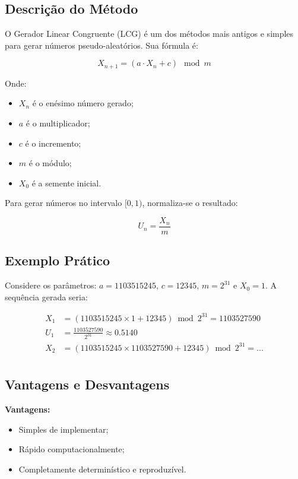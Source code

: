 \documentclass[12pt,a4paper]{article}
\begin{document}
\subsection{Descrição do Método}

O Gerador Linear Congruente (LCG) é um dos métodos mais antigos e simples para gerar números pseudo-aleatórios. Sua fórmula é:

\begin{equation}
X_{n+1} = (a \cdot X_n + c) \mod m
\end{equation}

Onde:
\begin{itemize}
    \item $X_n$ é o enésimo número gerado;
    \item $a$ é o multiplicador;
    \item $c$ é o incremento;
    \item $m$ é o módulo;
    \item $X_0$ é a semente inicial.
\end{itemize}

Para gerar números no intervalo $[0, 1)$, normaliza-se o resultado:

\begin{equation}
U_n = \frac{X_n}{m}
\end{equation}

\subsection{Exemplo Prático}

Considere os parâmetros: $a = 1103515245$, $c = 12345$, $m = 2^{31}$ e $X_0 = 1$. A sequência gerada seria:

\begin{align*}
X_1 &= (1103515245 \times 1 + 12345) \bmod 2^{31} = 1103527590 \\
U_1 &= \frac{1103527590}{2^{31}} \approx 0.5140 \\
X_2 &= (1103515245 \times 1103527590 + 12345) \bmod 2^{31} = ... \\
\end{align*}

\subsection{Vantagens e Desvantagens}

\textbf{Vantagens:}
\begin{itemize}
    \item Simples de implementar;
    \item Rápido computacionalmente;
    \item Completamente determinístico e reproduzível.
\end{itemize}
\end{document}
